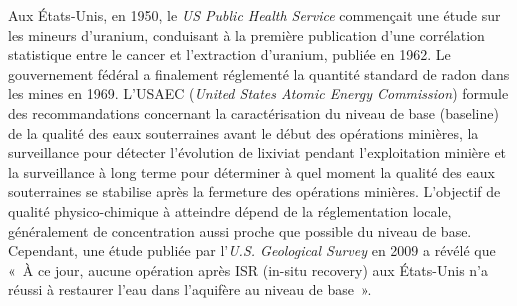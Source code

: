 \documentclass{article}
\begin{document}
Aux États-Unis, en 1950, le \textit{US Public Health Service} commençait une étude sur les mineurs d'uranium, conduisant à la première publication d'une corrélation statistique entre le cancer et l'extraction d'uranium, publiée en 1962. Le gouvernement fédéral a finalement réglementé la quantité standard de radon dans les mines en 1969.%
L'USAEC (\textit{United States Atomic Energy Commission}) formule des recommandations concernant la caractérisation du niveau de base (baseline) de la qualité des eaux souterraines avant le début des opérations minières, la surveillance pour détecter l’évolution de lixiviat pendant l'exploitation minière et la surveillance à long terme pour déterminer à quel moment la qualité des eaux souterraines se stabilise après la fermeture des opérations minières.
L'objectif de qualité physico-chimique à atteindre dépend de la réglementation locale, généralement de concentration aussi proche que possible du niveau de base.
Cependant, une étude publiée par l'\textit{U.S. Geological Survey} en 2009 a révélé que « À ce jour, aucune opération après ISR (in-situ recovery) aux États-Unis n'a réussi à restaurer l'eau dans l'aquifère au niveau de base ».
\end{document}
